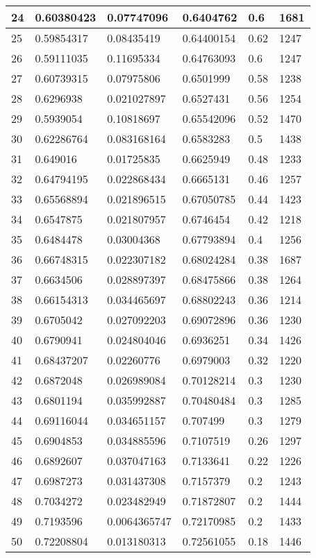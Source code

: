 \begin{longtable}{|l|l|l|l|l|l|}
24 & 0.60380423 & 0.07747096 & 0.6404762 & 0.6 & 1681 \\ \hline 
25 & 0.59854317 & 0.08435419 & 0.64400154 & 0.62 & 1247 \\ \hline 
26 & 0.59111035 & 0.11695334 & 0.64763093 & 0.6 & 1247 \\ \hline 
27 & 0.60739315 & 0.07975806 & 0.6501999 & 0.58 & 1238 \\ \hline 
28 & 0.6296938 & 0.021027897 & 0.6527431 & 0.56 & 1254 \\ \hline 
29 & 0.5939054 & 0.10818697 & 0.65542096 & 0.52 & 1470 \\ \hline 
30 & 0.62286764 & 0.083168164 & 0.6583283 & 0.5 & 1438 \\ \hline 
31 & 0.649016 & 0.01725835 & 0.6625949 & 0.48 & 1233 \\ \hline 
32 & 0.64794195 & 0.022868434 & 0.6665131 & 0.46 & 1257 \\ \hline 
33 & 0.65568894 & 0.021896515 & 0.67050785 & 0.44 & 1423 \\ \hline 
34 & 0.6547875 & 0.021807957 & 0.6746454 & 0.42 & 1218 \\ \hline 
35 & 0.6484478 & 0.03004368 & 0.67793894 & 0.4 & 1256 \\ \hline 
36 & 0.66748315 & 0.022307182 & 0.68024284 & 0.38 & 1687 \\ \hline 
37 & 0.6634506 & 0.028897397 & 0.68475866 & 0.38 & 1264 \\ \hline 
38 & 0.66154313 & 0.034465697 & 0.68802243 & 0.36 & 1214 \\ \hline 
39 & 0.6705042 & 0.027092203 & 0.69072896 & 0.36 & 1230 \\ \hline 
40 & 0.6790941 & 0.024804046 & 0.6936251 & 0.34 & 1426 \\ \hline 
41 & 0.68437207 & 0.02260776 & 0.6979003 & 0.32 & 1220 \\ \hline 
42 & 0.6872048 & 0.026989084 & 0.70128214 & 0.3 & 1230 \\ \hline 
43 & 0.6801194 & 0.035992887 & 0.70480484 & 0.3 & 1285 \\ \hline 
44 & 0.69116044 & 0.034651157 & 0.707499 & 0.3 & 1279 \\ \hline 
45 & 0.6904853 & 0.034885596 & 0.7107519 & 0.26 & 1297 \\ \hline 
46 & 0.6892607 & 0.037047163 & 0.7133641 & 0.22 & 1226 \\ \hline 
47 & 0.6987273 & 0.031437308 & 0.7157379 & 0.2 & 1243 \\ \hline 
48 & 0.7034272 & 0.023482949 & 0.71872807 & 0.2 & 1444 \\ \hline 
49 & 0.7193596 & 0.0064365747 & 0.72170985 & 0.2 & 1433 \\ \hline 
50 & 0.72208804 & 0.013180313 & 0.72561055 & 0.18 & 1446 \\ \hline 
\end{longtable}